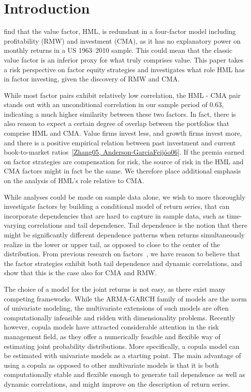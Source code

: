 \section{Introduction}
\textcite{FF2015} find that the value factor, HML, is redundant in a four-factor model including profitability (RMW) and investment (CMA), as it has no explanatory power on monthly returns in a US 1963–2010 sample. This could mean that the classic value factor is an inferior proxy for what truly comprises value. This paper takes a risk perspective on factor equity strategies and investigates what role HML has in factor investing, given the discovery of RMW and CMA. 

While most factor pairs exhibit relatively low correlation, the HML - CMA pair stands out with an unconditional correlation in our sample period of 0.63, indicating a much higher similarity between these two factors. In fact, there is also reason to expect a certain degree of overlap between the portfolios that comprise HML and CMA. Value firms invest less, and growth firms invest more, and there is a positive empirical relation between past investment and current book-to-market ratios~\autoref{Zhang05, Anderson-GarciaFeijóo06}. If the premia earned on factor strategies are compensation for risk, the source of risk in the HML and CMA factors might in fact be the same. We therefore place additional emphasis on the analysis of HML's role relative to CMA.

While analyses could be made on sample data alone, we wish to more thoroughly investigate factors by building a conditional model of return series, that can incorporate dependencies that are hard to capture in sample data, such as time-varying correlations and tail dependence. Tail dependence is the notion that there might be significantly different dependence patterns when returns simultaneously realize in the lower or upper tail, as opposed to close to the center of the distribution. From previous research on factors~\autocite{ChristoffersenLanglois2013}, we have reason to believe that the factor strategies exhibit both tail dependence and dynamic correlations, and show that this is the case also for CMA and RMW.

The choice of a model for the joint returns is not easy, as there exist many competing frameworks. While the ARMA-GARCH family of models are the norm of univariate modeling, the multivariate extensions of such models are often computationally infeasible and ridden with dimensionality problems. Recently however, copula models have attracted considerable attention in the risk management field, as they offer a numerically feasible and flexible way of estimating joint probability distributions. More specifically, a copula model can be estimated with univariate models as a starting point. The main advantage of using a copula as opposed to other multivariate models is that it is both computationally stable and flexible enough to generate tail dependence as well as dynamic correlations, and might improve on the description of return series. 

